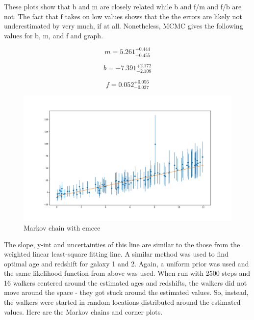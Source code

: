 \documentclass{article}
\begin{document}
These plots show that b and m are closely related while b and f/m and f/b are not. The fact that f
takes on low values shows that the the errors are likely not underestimated by very much, if at all. Nonetheless, MCMC gives the following values for b, m, and f and graph.

$$m = 5.261^{+0.444}_{-0.455}$$

$$b = -7.391^{+2.172}_{-2.108}$$

$$f = 0.052^{+0.056}_{-0.037}$$

\begin{figure}[H]
  \centering
\includegraphics[scale=0.2]{Data and line 2}
\caption{Markov chain with emcee}
\end{figure}

The slope, y-int and uncertainties of this line are similar to the those from the weighted linear
least-square fitting line. A similar method was used to find optimal age and redshift for galaxy
1 and 2. Again, a uniform prior was used and the same likelihood function from above was used. When run with 2500 steps and 16 walkers centered around the estimated ages and redshifts,
the walkers did not move around the space - they got stuck around the estimated values. So, instead,
the walkers were started in random locations distributed around the estimated values. Here are the Markov
chains and corner plots.
\end{document}
